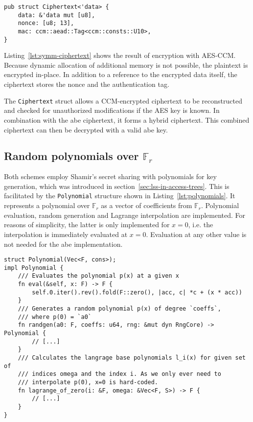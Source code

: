 \begin{lstlisting}[float=h,caption={Symmetric Ciphertext struct},label={lst:symm-ciphertext}]
pub struct Ciphertext<'data> {
    data: &'data mut [u8],
    nonce: [u8; 13],
    mac: ccm::aead::Tag<ccm::consts::U10>,
}
\end{lstlisting}

Listing~\ref{lst:symm-ciphertext} shows the result of encryption with AES-CCM.
Because dynamic allocation of additional memory is not possible, the plaintext is encrypted in-place.
In addition to a reference to the encrypted data itself, the ciphertext stores the nonce and the authentication tag.

The \texttt{Ciphertext} struct allows a CCM-encrypted ciphertext to be reconstructed and checked for unauthorized modifications if the AES key is known.
In combination with the \acrshort{abe} ciphertext, it forms a hybrid ciphertext.
This combined ciphertext can then be decrypted with a valid \acrshort{abe} key.

\subsection{Random polynomials over $\mathbb{F}_r$}

Both schemes employ Shamir's secret sharing with polynomials for key generation, which was introduced in section~\ref{sec:lss-in-access-trees}.
This is facilitated by the \texttt{Polynomial} structure shown in Listing~\ref{lst:polynomials}.
It represents a polynomial over $\mathbb{F}_r$ as a vector of coefficients from $\mathbb{F}_r$.
Polynomial evaluation, random generation and Lagrange interpolation are implemented.
For reasons of simplicity, the latter is only implemented for $x=0$, i.e. the interpolation is immediately evaluated at $x=0$.
Evaluation at any other value is not needed for the \acrshort{abe} implementation.

\begin{lstlisting}[float=h,caption={Implementation of polynomials over $\mathbb{F}_r$},label={lst:polynomials}]
struct Polynomial(Vec<F, cons>);
impl Polynomial {
    /// Evaluates the polynomial p(x) at a given x
    fn eval(&self, x: F) -> F {
        self.0.iter().rev().fold(F::zero(), |acc, c| *c + (x * acc))
    }
    /// Generates a random polynomial p(x) of degree `coeffs`,
    /// where p(0) = `a0`
    fn randgen(a0: F, coeffs: u64, rng: &mut dyn RngCore) -> Polynomial {
        // [...]
    }
    /// Calculates the langrage base polynomials l_i(x) for given set of
    /// indices omega and the index i. As we only ever need to
    /// interpolate p(0), x=0 is hard-coded.
    fn lagrange_of_zero(i: &F, omega: &Vec<F, S>) -> F {
        // [...]
    }
}
\end{lstlisting}

